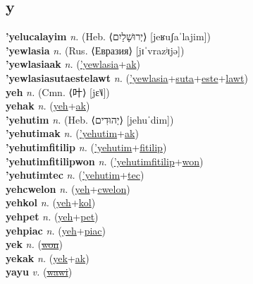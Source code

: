 \subsection{y}

\textbf{'yelucalayim} \textit{n.} (Heb. ⟨יְרוּשָׁלַיִם⟩ [jeʁuʃaˈlajim])
 \label{'yelucalayim} \\
\textbf{'yewlasia} \textit{n.} (Rus. ⟨Евразия⟩ [jɪˈvrazʲɪjə])
 \label{'yewlasia} \\
\textbf{'yewlasiaak} \textit{n.} (\hyperref['yewlasia]{'yewlasia}+\hyperref[ak]{ak})
 \label{'yewlasiaak} \\
\textbf{'yewlasiasutaestelawt} \textit{n.} (\hyperref['yewlasia]{'yewlasia}+\hyperref[suta]{suta}+\hyperref[este]{este}+\hyperref[lawt]{lawt})
 \label{'yewlasiasutaestelawt} \\
\textbf{yeh} \textit{n.} (Cmn. ⟨叶⟩ [jɛ˥˩])
 \label{yeh} \\
\textbf{yehak} \textit{n.} (\hyperref[yeh]{yeh}+\hyperref[ak]{ak})
 \label{yehak} \\
\textbf{'yehutim} \textit{n.} (Heb. ⟨יְהוּדִים⟩ [jehuˈdim])
 \label{'yehutim} \\
\textbf{'yehutimak} \textit{n.} (\hyperref['yehutim]{'yehutim}+\hyperref[ak]{ak})
 \label{'yehutimak} \\
\textbf{'yehutimfitilip} \textit{n.} (\hyperref['yehutim]{'yehutim}+\hyperref[fitilip]{fitilip})
 \label{'yehutimfitilip} \\
\textbf{'yehutimfitilipwon} \textit{n.} (\hyperref['yehutimfitilip]{'yehutimfitilip}+\hyperref[won]{won})
 \label{'yehutimfitilipwon} \\
\textbf{'yehutimtec} \textit{n.} (\hyperref['yehutim]{'yehutim}+\hyperref[tec]{tec})
 \label{'yehutimtec} \\
\textbf{yehcwelon} \textit{n.} (\hyperref[yeh]{yeh}+\hyperref[cwelon]{cwelon})
 \label{yehcwelon} \\
\textbf{yehkol} \textit{n.} (\hyperref[yeh]{yeh}+\hyperref[kol]{kol})
 \label{yehkol} \\
\textbf{yehpet} \textit{n.} (\hyperref[yeh]{yeh}+\hyperref[pet]{pet})
 \label{yehpet} \\
\textbf{yehpiac} \textit{n.} (\hyperref[yeh]{yeh}+\hyperref[piac]{piac})
 \label{yehpiac} \\
\textbf{yek} \textit{n.} (\hyperref[won]{\sout{won}})
 \label{yek} \\
\textbf{yekak} \textit{n.} (\hyperref[yek]{yek}+\hyperref[ak]{ak})
 \label{yekak} \\
\textbf{yayu} \textit{v.} (\hyperref[wawi]{\sout{wawi}})
